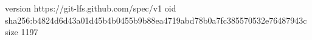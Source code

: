 version https://git-lfs.github.com/spec/v1
oid sha256:b4824d6d43a01d45b4b0455b9b88ea4719abd78b0a7fc385570532e76487943c
size 1197
